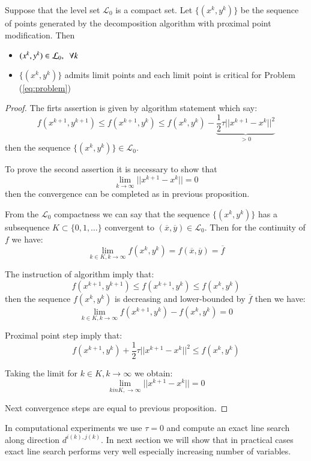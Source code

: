 \begin{proposition}
Suppose that the level set $\mathcal{L}_0$ is a compact set. Let $\{(x^k, y^k)\}$ be the sequence of points generated by the decomposition algorithm with proximal point modification. Then
\begin{itemize}
\item $(x^k, y^k) \in \mathcal{L}_0, \enskip \forall k$ 
\item  $\{(x^k, y^k)\}$ admits limit points and each limit point is critical for Problem (\ref{eq:problem})
\end{itemize}
\end{proposition}
\begin{proof}
The firts assertion is given by algorithm statement which say:
\begin{equation}
f(x^{k+1},y^{k+1})\le f(x^{k+1},y^k)\le f(x^k,y^k)- \underbrace{\frac{1}{2}\tau ||x^{k+1}-x^{k}||^2}_{>0}
\end{equation}
then the sequence $\{(x^k,y^k)\} \in \mathcal{L}_0$.

To prove the second assertion it is necessary to show that
\begin{equation}
\lim_{k \rightarrow \infty} ||x^{k+1}-x^{k}||=0
\end{equation}
then the convergence can be completed as in previous proposition.


From the $\mathcal{L}_0$ compactness we can say that the sequence $\{(x^k,y^k)\}$ has a subsequence $K \subset \{0,1,\ldots\}$ convergent to $(\overline{x},\overline{y}) \in \mathcal{L}_0$. Then for the continuity of $f$ we have:
\begin{equation}
\lim_{k \in K, k \rightarrow \infty}f(x^k,y^k)=f(\overline{x},\overline{y})= \overline{f}
\end{equation}

The instruction of algorithm imply that:
\begin{equation}
f(x^{k+1},y^{k+1})\le f(x^{k+1},y^{k})\le f(x^k,y^k)
\end{equation}
then the sequence $f(x^k,y^k)$ is decreasing and lower-bounded by $\overline{f}$ then we have:
\begin{equation}
\lim_{k \in K, k \rightarrow \infty} f(x^{k+1},y^{k})-f(x^{k},y^{k})=0
\end{equation}

Proximal point step imply that:
\begin{equation}
f(x^{k+1},y^{k})+\frac{1}{2}\tau||x^{k+1}-x^{k}||^2 \le f(x^{k},y^{k})
\end{equation}

Taking the limit for $k \in K, k \rightarrow \infty$ we obtain:
\begin{equation}
\lim_{k in K, \rightarrow \infty} ||x^{k+1}-x^{k}||=0
\end{equation}

Next convergence steps are equal to previous proposition.
\end{proof}

\begin{oss}
In computational experiments we use $\tau = 0$ and compute an exact line search along direction $d^{i(k),j(k)}$. In next section we will show that in practical cases exact line search performs very well especially increasing number of variables.
\end{oss}
